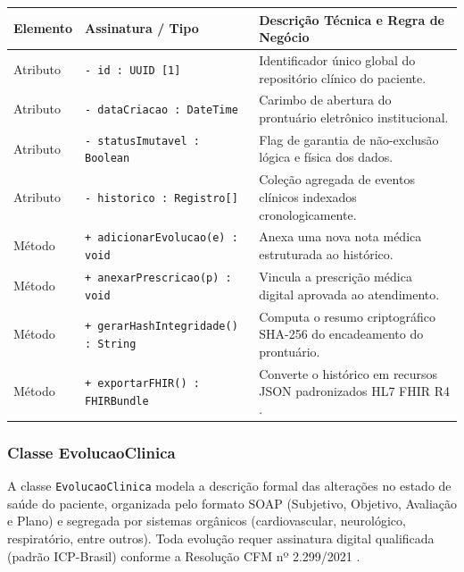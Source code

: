 \begingroup
\small
\noindent\begin{tabularx}{\linewidth}{l >{\raggedright\arraybackslash}p{5.7cm} >{\raggedright\arraybackslash}X}
\toprule
\textbf{Elemento} & \textbf{Assinatura / Tipo} & \textbf{Descrição Técnica e Regra de Negócio} \\
\midrule
Atributo & \texttt{- id : UUID [1]} & Identificador único global do repositório clínico do paciente. \\
Atributo & \texttt{- dataCriacao : DateTime} & Carimbo de abertura do prontuário eletrônico institucional. \\
Atributo & \texttt{- statusImutavel : Boolean} & Flag de garantia de não-exclusão lógica e física dos dados. \\
Atributo & \texttt{- historico : Registro[]} & Coleção agregada de eventos clínicos indexados cronologicamente. \\
\midrule
Método & \texttt{+ adicionarEvolucao(e) : void} & Anexa uma nova nota médica estruturada ao histórico. \\
Método & \texttt{+ anexarPrescricao(p) : void} & Vincula a prescrição médica digital aprovada ao atendimento. \\
Método & \texttt{+ gerarHashIntegridade() : String} & Computa o resumo criptográfico SHA-256 do encadeamento do prontuário. \\
Método & \texttt{+ exportarFHIR() : FHIRBundle} & Converte o histórico em recursos JSON padronizados HL7 FHIR R4 \cite{hl7_fhir:2019}. \\
\bottomrule
\end{tabularx}
\endgroup

\subsubsection{Classe EvolucaoClinica}
A classe \texttt{EvolucaoClinica} modela a descrição formal das alterações no estado de saúde do paciente, organizada pelo formato SOAP (Subjetivo, Objetivo, Avaliação e Plano) e segregada por sistemas orgânicos (cardiovascular, neurológico, respiratório, entre outros). Toda evolução requer assinatura digital qualificada (padrão ICP-Brasil) conforme a Resolução CFM nº 2.299/2021 \cite{cfm_digital:2021}.

